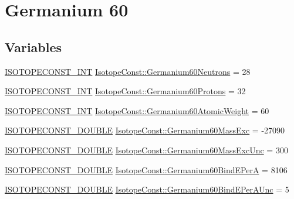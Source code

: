 \hypertarget{group___isotope_const-_germanium-_ge60}{}\section{Germanium 60}
\label{group___isotope_const-_germanium-_ge60}
\subsection*{Variables}
\begin{DoxyCompactItemize}
\item 
\mbox{\hyperlink{group___isotope_const-_macros_ga5f18360b3e99483a35c32d789e62621c}{I\+S\+O\+T\+O\+P\+E\+C\+O\+N\+S\+T\+\_\+\+I\+NT}} \mbox{\hyperlink{group___isotope_const-_germanium-_ge60_ga70b4c73dcee3d5ffde6ed9333594ea14}{Isotope\+Const\+::\+Germanium60\+Neutrons}} = 28
\item 
\mbox{\hyperlink{group___isotope_const-_macros_ga5f18360b3e99483a35c32d789e62621c}{I\+S\+O\+T\+O\+P\+E\+C\+O\+N\+S\+T\+\_\+\+I\+NT}} \mbox{\hyperlink{group___isotope_const-_germanium-_ge60_gacdea4e760f43eecbcb05d83e3db618e2}{Isotope\+Const\+::\+Germanium60\+Protons}} = 32
\item 
\mbox{\hyperlink{group___isotope_const-_macros_ga5f18360b3e99483a35c32d789e62621c}{I\+S\+O\+T\+O\+P\+E\+C\+O\+N\+S\+T\+\_\+\+I\+NT}} \mbox{\hyperlink{group___isotope_const-_germanium-_ge60_gaaafa0b7078ce1e7d95b243c021289535}{Isotope\+Const\+::\+Germanium60\+Atomic\+Weight}} = 60
\item 
\mbox{\hyperlink{group___isotope_const-_macros_ga8f45a7272ce02c0b4c65c44636ed719a}{I\+S\+O\+T\+O\+P\+E\+C\+O\+N\+S\+T\+\_\+\+D\+O\+U\+B\+LE}} \mbox{\hyperlink{group___isotope_const-_germanium-_ge60_ga9b03ee9a53f8ceb2b48bff3011852f97}{Isotope\+Const\+::\+Germanium60\+Mass\+Exc}} = -\/27090
\item 
\mbox{\hyperlink{group___isotope_const-_macros_ga8f45a7272ce02c0b4c65c44636ed719a}{I\+S\+O\+T\+O\+P\+E\+C\+O\+N\+S\+T\+\_\+\+D\+O\+U\+B\+LE}} \mbox{\hyperlink{group___isotope_const-_germanium-_ge60_ga5cf7fb70c2dc4f9bf1e264ae53c433e2}{Isotope\+Const\+::\+Germanium60\+Mass\+Exc\+Unc}} = 300
\item 
\mbox{\hyperlink{group___isotope_const-_macros_ga8f45a7272ce02c0b4c65c44636ed719a}{I\+S\+O\+T\+O\+P\+E\+C\+O\+N\+S\+T\+\_\+\+D\+O\+U\+B\+LE}} \mbox{\hyperlink{group___isotope_const-_germanium-_ge60_gadbb6171ee682b934a3ada4f56bd81917}{Isotope\+Const\+::\+Germanium60\+Bind\+E\+PerA}} = 8106
\item 
\mbox{\hyperlink{group___isotope_const-_macros_ga8f45a7272ce02c0b4c65c44636ed719a}{I\+S\+O\+T\+O\+P\+E\+C\+O\+N\+S\+T\+\_\+\+D\+O\+U\+B\+LE}} \mbox{\hyperlink{group___isotope_const-_germanium-_ge60_ga90b920cfecf97f54d517a28a1adfc978}{Isotope\+Const\+::\+Germanium60\+Bind\+E\+Per\+A\+Unc}} = 5

\end{DoxyCompactItemize}
